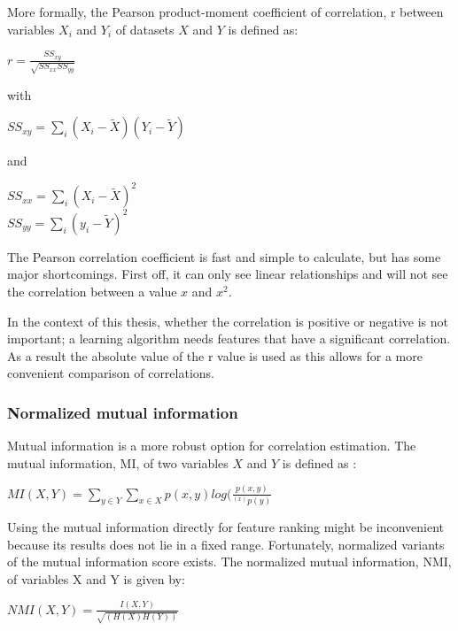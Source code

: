 \npar

More formally\citep{corrPaper}, the Pearson product-moment coefficient of correlation, r between variables $X_i$ and $Y_i$ of datasets $X$ and $Y$ is defined as:

\begin{center}
$r = \frac{SS_{xy}}{\sqrt{SS_{xx}SS_{yy}}}$
\end{center}
with
\begin{center}
$SS_{xy} = \sum\limits_i (X_i-\tilde{X})(Y_i-\tilde{Y})$
\end{center}
and
\begin{center}
$SS_{xx} = \sum\limits_i (X_i-\tilde{X})^2$ \\
$SS_{yy} = \sum\limits_i (y_i-\tilde{Y})^2$
\end{center}

\npar

The Pearson correlation coefficient is fast and simple to calculate, but has some major shortcomings. First off, it can only see linear relationships and will not see the correlation between a value $x$ and $x^2$.

\npar

In the context of this thesis, whether the correlation is positive or negative is not important; a learning algorithm needs features that have a significant correlation. As a result the absolute value of the r value is used as this allows for a more convenient comparison of correlations.

\subsubsection{Normalized mutual information}
Mutual information is a more robust option for correlation estimation. The mutual information, MI, of two variables $X$ and $Y$ is defined as \citep{mutPaper}:
\begin{center}
$MI(X,Y) = \sum\limits_{y\in Y} \sum\limits_{x\in X} p(x,y)log(\frac{p(x,y)}{^(x)p(y)}$
\end{center}

\npar

Using the mutual information directly for feature ranking might be inconvenient because its results does not lie in a fixed range. Fortunately, normalized variants of the mutual information score exists. The normalized mutual information, NMI, of variables X and Y is given by:

\begin{center}
$NMI(X,Y) = \frac{I(X,Y)}{\sqrt{(H(X)H(Y))}}$
\end{center}

